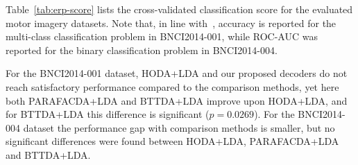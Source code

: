 Table~\ref{tab:erp-score} lists the cross-validated classification score for
the evaluated motor imagery datasets.
Note that, in line with~\cite{Chevallier2024}, accuracy is reported for the
multi-class classification problem in BNCI2014-001, while ROC-AUC was reported for the
binary classification problem in BNCI2014-004.
\begin{table}[t]
  \centering
	\footnotesize
	
  \caption[%
    Whithin-session classification score for 2 motor imagery datasets.
    ]{Classification score for
		cross-validated whithin-session evaluation for HODA+LDA and our proposed decoders
		PARAFACDA+LDA and BTTDA+LDA evaluated on 2 motor imagery datasets.
		Scores for other decoders were taken from \cite{Chevallier2024}. Accuracy
    is listed for BNCI2014-001 and area under the receiver-operator
    characteriscic curve for BNCI2014-004. BTTDA outperforms HODA and PARAFACDA
    for BNCI2014-001 but does not reach a performance comparable to current
    state-of the art. For BNCI2014-004, PARAFACDA and BTTDA perform
    approximately on par with HODA and the current state-of-the art.}
	\label{tab:mi-score}
\end{table}
For the BNCI2014-001 dataset, HODA+LDA and our proposed decoders do not reach
satisfactory performance compared to the comparison methods, yet here both
PARAFACDA+LDA and BTTDA+LDA improve upon HODA+LDA, and for BTTDA+LDA this
difference is significant ($p=0.0269$).
For the BNCI2014-004 dataset the performance gap with comparison methods is
smaller, but no significant differences were found between HODA+LDA,
PARAFACDA+LDA and BTTDA+LDA.

